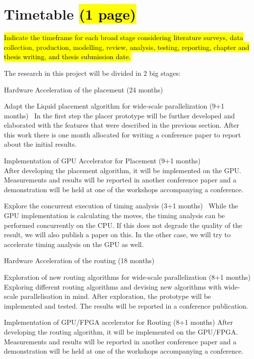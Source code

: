 \documentclass[a4paper,oneside,12pt]{article}
\begin{document}
\newpage

\section{Timetable \hl{(1 page)}}\label{timetable}
\hl{ Indicate the timeframe for each broad stage considering literature surveys, data collection, production, modelling, review, analysis,
testing, reporting, chapter and thesis writing, and thesis submission date.}

The research in this project will be divided in 2 big stages:

\begin{description*}
\item[Hardware Acceleration of the placement (24 months)]\ %

\begin{description*}
\item[Adapt the {\sc Liquid} placement algorithm for wide-scale parallelization (9+1 months)]\
In the first step the placer prototype will be further developed and elaborated with the features that were described in the previous section. After this work there is one month allocated for writing a conference paper to report about the initial results.
\item[Implementation of GPU Accelerator for Placement (9+1 months)]\
\\After developing the placement algorithm, it will be implemented on the GPU. Measurements and results will be reported in another conference paper and a demonstration will be held at one of the workshops accompanying a conference. 
\item[Explore the concurrent execution of timing analysis (3+1 months)]\
While the GPU implementation is calculating the moves, the timing analysis can be performed concurrently on the CPU. If this does not degrade the quality of the result, we will also publish a paper on this. In the other case, we will try to accelerate timing analysis on the GPU as well.
\end{description*}

\item[Hardware Acceleration of the routing (18 months)]\

\begin{description*}
\item[Exploration of new routing algorithms for wide-scale parallelization (8+1 months)] 
Exploring different routing algorithms and devising new algorithms with wide-scale parallelisation in mind. After exploration, the prototype will be implemented and tested. The results will be reported in a conference publication.
\item[Implementation of GPU/FPGA accelerator for Routing (8+1 months)]
After developing the routing algorithm, it will be implemented on the GPU/FPGA. Measurements and results will be reported in another conference paper and a demonstration will be held at one of the workshops accompanying a conference. 
\end{description*}


\end{description*}
\end{document}
